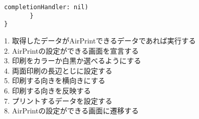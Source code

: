 \begin{description}
\begin{lstlisting}[basicstyle=\ttfamily\footnotesize, frame=single]
            completionHandler: nil)
       }
}
 \end{lstlisting}
 1. 取得したデータがAirPrintできるデータであれば実行する\\
 2. AirPrintの設定ができる画面を宣言する \\
 3. 印刷をカラーか白黒か選べるようにする \\
 4. 両面印刷の長辺とじに設定する \\
 5. 印刷する向きを横向きにする \\
 6. 印刷する向きを反映する \\
 7. プリントするデータを設定する \\
 8. AirPrintの設定ができる画面に遷移する \\
\end{description}


